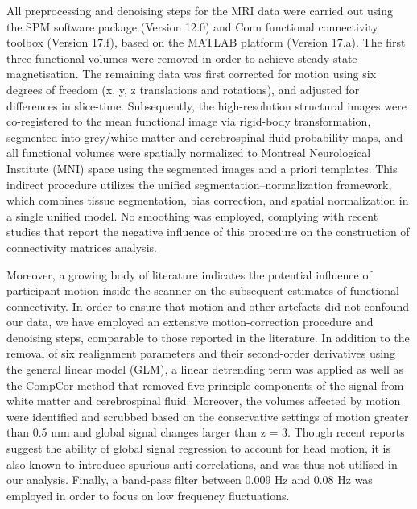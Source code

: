 All preprocessing and denoising steps for the MRI data were carried out using the SPM software package (Version 12.0) and Conn functional connectivity toolbox (Version 17.f), based on the MATLAB platform (Version 17.a). The first three functional volumes were removed in order to achieve steady state magnetisation. The remaining data was first corrected for motion using six degrees of freedom (x, y, z translations and rotations), and adjusted for differences in slice-time. Subsequently, the high-resolution structural images were co-registered to the mean functional image via rigid-body transformation, segmented into grey/white matter and cerebrospinal fluid probability maps, and all functional volumes were spatially normalized to Montreal Neurological Institute (MNI) space using the segmented images and a priori templates. This indirect procedure utilizes the unified segmentation–normalization framework, which combines tissue segmentation, bias correction, and spatial normalization in a single unified model. No smoothing was employed, complying with recent studies that report the negative influence of this procedure on the construction of connectivity matrices analysis. 

Moreover, a growing body of literature indicates the potential influence of participant motion inside the scanner on the subsequent estimates of functional connectivity. In order to ensure that motion and other artefacts did not confound our data, we have employed an extensive motion-correction procedure and denoising steps, comparable to those reported in the literature. In addition to the removal of six realignment parameters and their second-order derivatives using the general linear model (GLM), a linear detrending term was applied as well as the CompCor method that removed five principle components of the signal from white matter and cerebrospinal fluid. Moreover, the volumes affected by motion were identified and scrubbed based on the conservative settings of motion greater than 0.5 mm and global signal changes larger than z = 3. Though recent reports suggest the ability of global signal regression to account for head motion, it is also known to introduce spurious anti-correlations, and was thus not utilised in our analysis. Finally, a band-pass filter between 0.009 Hz and 0.08 Hz was employed in order to focus on low frequency fluctuations.

